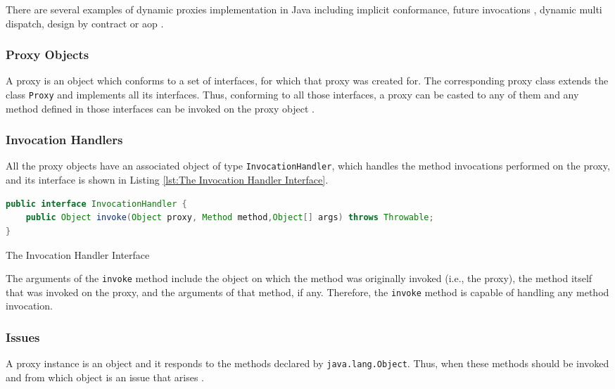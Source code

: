 There are several examples of dynamic proxies implementation in Java including implicit conformance, future invocations \cite{pratikakis2004transparent}, dynamic multi dispatch, design by contract or \ac{aop} \cite{eugster2006uniform}.

\subsubsection{Proxy Objects}\label{Proxy Objects}
A proxy is an object which conforms to a set of interfaces, for which that proxy was created for. 
The corresponding proxy class extends the class \texttt{Proxy} and implements all its interfaces.
Thus, conforming to all those interfaces, a proxy can be casted to any of them and any method defined in those interfaces can be invoked on the proxy object \cite{eugster2006uniform}.

\subsubsection{Invocation Handlers}\label{Invocation Handlers}
All the proxy objects have an associated object of type \texttt{InvocationHandler}, which handles the method invocations performed on the proxy, and its interface is shown in Listing \ref{lst:The Invocation Handler Interface}.

\begin{sourcecode}
	\begin{lstlisting}[language=Java]
public interface InvocationHandler {
	public Object invoke(Object proxy, Method method,Object[] args) throws Throwable;
}		
	\end{lstlisting}
	\caption{The Invocation Handler Interface}
	\label{lst:The Invocation Handler Interface}
\end{sourcecode}

The arguments of the \texttt{invoke} method include the object on which the method was originally invoked (i.e., the proxy), the method itself that was invoked on the proxy, and the arguments of that method, if any.
Therefore, the \texttt{invoke} method is capable of handling any method invocation.

\subsubsection{Issues}\label{Dynamic Proxies Issues}
A proxy instance is an object and it responds to the methods declared by \texttt{java.lang.Object}. 
Thus, when these methods should be invoked and from which object is an issue that arises \cite{forman2004java}.

